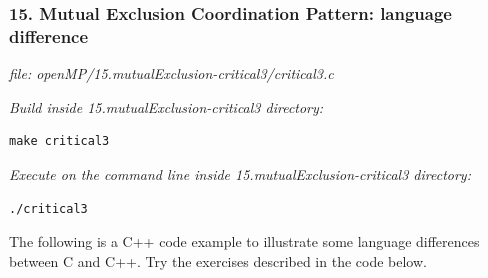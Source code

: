 \documentclass[letterpaper,10pt,openany,oneside]{sphinxmanual}
\begin{document}
\subsubsection{15.  Mutual Exclusion Coordination Pattern: language difference}
\label{SharedMemory/MutualExclusion:mutual-exclusion-coordination-pattern-language-difference}
\emph{file: openMP/15.mutualExclusion-critical3/critical3.c}

\emph{Build inside 15.mutualExclusion-critical3 directory:}

\begin{Verbatim}[commandchars=\\\{\}]
make critical3
\end{Verbatim}

\emph{Execute on the command line inside 15.mutualExclusion-critical3 directory:}

\begin{Verbatim}[commandchars=\\\{\}]
./critical3
\end{Verbatim}

The following is a C++ code example to illustrate some language differences between C and C++.  Try the exercises described in the code below.
\end{document}
